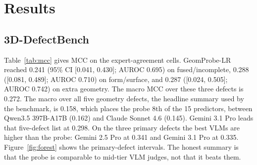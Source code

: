 \section{Results}
\label{sec:results}

\subsection{3D-DefectBench}
\label{sec:db}

Table~\ref{tab:mcc} gives MCC on the expert-agreement cells.
GeomProbe-LR reached 0.241 (95\% CI [0.041, 0.430]; AUROC 0.695) on fused/incomplete, 0.288 ([0.081, 0.489]; AUROC 0.710) on form/surface, and 0.287 ([0.024, 0.505]; AUROC 0.742) on extra geometry.
The macro MCC over these three defects is 0.272.
The macro over all five geometry defects, the headline summary used by the benchmark, is 0.158, which places the probe 8th of the 15 predictors, between Qwen3.5 397B-A17B (0.162) and Claude Sonnet 4.6 (0.145).
Gemini 3.1 Pro leads that five-defect list at 0.298.
On the three primary defects the best VLMs are higher than the probe: Gemini 2.5 Pro at 0.341 and Gemini 3.1 Pro at 0.335.
Figure~\ref{fig:forest} shows the primary-defect intervals.
The honest summary is that the probe is comparable to mid-tier VLM judges, not that it beats them.


